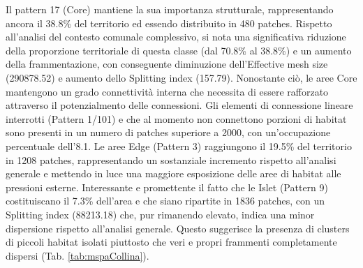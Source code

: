 \documentclass[
]{book}
\begin{document}
Il pattern 17 (Core) mantiene la sua importanza strutturale, rappresentando ancora il 38.8\% del territorio ed essendo distribuito in 480 patches.
Rispetto all'analisi del contesto comunale complessivo, si nota una significativa riduzione della proporzione territoriale di questa classe (dal 70.8\% al 38.8\%) e un aumento della frammentazione, con conseguente diminuzione dell'Effective mesh size (290878.52) e aumento dello Splitting index (157.79).
Nonostante ciò, le aree Core mantengono un grado connettività interna che necessita di essere rafforzato attraverso il potenzialmento delle connessioni.
Gli elementi di connessione lineare interrotti (Pattern 1/101) e che al momento non connettono porzioni di habitat sono presenti in un numero di patches superiore a 2000, con un'occupazione percentuale dell'8.1.
Le aree Edge (Pattern 3) raggiungono il 19.5\% del territorio in 1208 patches, rappresentando un sostanziale incremento rispetto all'analisi generale e mettendo in luce una maggiore esposizione delle aree di habitat alle pressioni esterne.
Interessante e promettente il fatto che le Islet (Pattern 9) costituiscano il 7.3\% dell'area e che siano ripartite in 1836 patches, con un Splitting index (88213.18) che, pur rimanendo elevato, indica una minor dispersione rispetto all'analisi generale.
Questo suggerisce la presenza di clusters di piccoli habitat isolati piuttosto che veri e propri frammenti completamente dispersi (Tab. \ref{tab:mspaCollina}).
\end{document}
